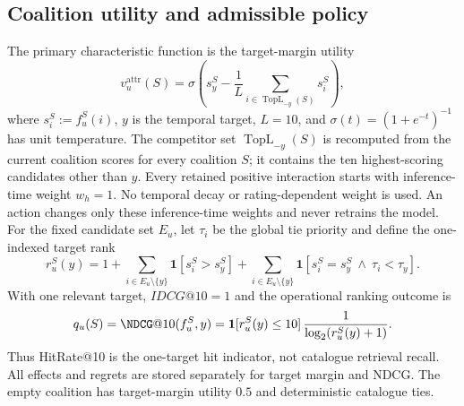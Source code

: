 \documentclass[pdflatex,sn-mathphys-num]{sn-jnl}
\begin{document}
\subsection{Coalition utility and admissible policy}
The primary characteristic function is the target-margin utility
\begin{equation}
v_u^{\mathrm{attr}}(S)=\sigma\left(s_y^S-\frac{1}{L}\sum_{i\in\operatorname{TopL}_{-y}(S)}s_i^S\right),
\end{equation}
where $s_i^S:=f_u^S(i)$, $y$ is the temporal target, $L=10$, and $\sigma(t)=(1+e^{-t})^{-1}$ has unit temperature. The competitor set $\operatorname{TopL}_{-y}(S)$ is recomputed from the current coalition scores for every coalition $S$; it contains the ten highest-scoring candidates other than $y$. Every retained positive interaction starts with inference-time weight $w_h=1$. No temporal decay or rating-dependent weight is used. An action changes only these inference-time weights and never retrains the model. For the fixed candidate set $E_u$, let $\tau_i$ be the global tie priority and define the one-indexed target rank
\begin{equation}
r_u^S(y)=1+\sum_{i\in E_u\setminus\{y\}}\mathbf{1}[s_i^S>s_y^S]
+\sum_{i\in E_u\setminus\{y\}}\mathbf{1}[s_i^S=s_y^S\ \wedge\ \tau_i<\tau_y].
\end{equation}
With one relevant target, $IDCG@10=1$ and the operational ranking outcome is
\begin{equation}
q_u(S)=\NDCG@10(f_u^S,y)=\mathbf{1}[r_u^S(y)\le10]\,\frac{1}{\log_2(r_u^S(y)+1)}.
\label{eq:ndcg-one-target}
\end{equation}
Thus HitRate@10 is the one-target hit indicator, not catalogue retrieval recall.
All effects and regrets are stored separately for target margin and NDCG. The empty coalition has target-margin utility $0.5$ and deterministic catalogue ties.
\end{document}
